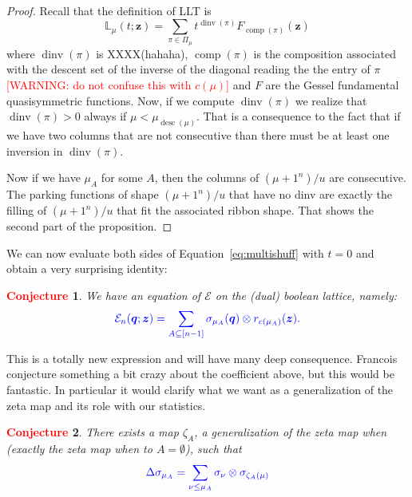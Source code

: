 \documentclass[12pt]{amsart}
\newcommand{\blue}[1]{\textcolor{blue}{#1}}
\newcommand{\red}[1]{\textcolor{red}{#1}}
\theoremstyle{plain}
\newtheorem{conjecture}{\red{Conjecture}}
\theoremstyle{definition}
\theoremstyle{remark}
\newcommand{\Qvar}{{\bm q}}
\newcommand{\Zvar}{{\bm z}}
\newcommand{\dinv}{\mathop{\mathrm{dinv}}}
\newcommand{\desc}{\mathop{\mathrm{desc}}}
\newcommand{\comp}{\mathop{\mathrm{comp}}}
\begin{document}
\begin{proof}
Recall that the definition of LLT is
\[
{\mathbb L}_\mu(t;\Zvar) = \sum_{\pi\in \Pi_\mu} t^{\dinv(\pi)} F_{\comp(\pi)}(\Zvar)
\]
where $\dinv(\pi)$ is XXXX(hahaha), $\comp(\pi)$ is the composition associated with the descent set of the inverse of the diagonal reading the the entry of $\pi$ \red{[WARNING: do not confuse this with $c(\mu)$]} and $F$ are the Gessel fundamental quasisymmetric functions.
Now, if we compute $\dinv(\pi)$ we realize that $\dinv(\pi)>0$ always if $\mu<\mu_{\desc(\mu)}$.
That is a consequence to the fact that if we have two columns that are not consecutive than there must be at least one inversion in $\dinv(\pi)$. 

Now if we have $\mu_A$ for some $A$, then the columns of $(\mu+1^n)/u$ are consecutive. 
The parking functions of shape $(\mu+1^n)/u$ that have no dinv are exactly the filling of $(\mu+1^n)/u$ that fit the associated ribbon shape.
That shows the second part of the proposition.
\end{proof}

We can now evaluate both sides of Equation~\eqref{eq:multishuff} with $t=0$ and obtain a very surprising identity:

\begin{conjecture}\label{conj:cube}
We have an equation of ${\mathcal E}$ on the (dual) boolean lattice, namely: 
\begin{equation}\label{eq:cube}
\blue{
{\mathcal E}_n(\Qvar;\Zvar) = \sum_{A\subseteq [n-1] } \sigma_{\mu_A}(\Qvar)\otimes r_{c(\mu_A)}(\Zvar).
}
\end{equation}
\end{conjecture}

This is a totally new expression and will have many deep consequence. Francois conjecture something a bit crazy about the coefficient
above, but this would be fantastic. In particular it would clarify what we want as a generalization of the zeta map and its role with our statistics.


\begin{conjecture}\label{conj:coproduct}
There exists a map $\zeta_A$, a generalization of  the zeta map when (exactly the zeta map when to $A=\emptyset$), such that
\begin{equation}\label{eq:cube} 
\blue{
\Delta  \sigma_{\mu_A} = \sum_{\nu\le \mu_A} \sigma_\nu \otimes \sigma_{\zeta_A(\mu)}
}
\end{equation}
\end{conjecture}
\end{document}
